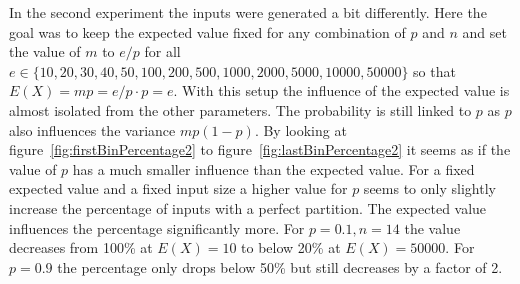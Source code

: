 In the second experiment the inputs were generated a bit differently. Here the goal was to keep the expected value fixed for any combination of $p$ and $n$ and set the value of $m$ to $e/p$ for all $e \in \{10, 20, 30, 40, 50, 100, 200, 500, 1000, 2000, 5000, 10000, 50000\}$ so that $E(X)=mp=e/p\cdot p=e$. With this setup the influence of the expected value is almost isolated from the other parameters. The probability is still linked to $p$ as $p$ also influences the variance $mp(1-p)$. By looking at figure~\ref{fig:firstBinPercentage2} to figure~\ref{fig:lastBinPercentage2} it seems as if the value of $p$ has a much smaller influence than the expected value. For a fixed expected value and a fixed input size a higher value for $p$ seems to only slightly increase the percentage of inputs with a perfect partition. The expected value influences the percentage significantly more. For $p=0.1, n=14$ the value decreases from 100\% at $E(X)=10$ to below 20\% at $E(X)=50000$. For $p=0.9$ the percentage only drops below 50\% but still decreases by a factor of 2.

